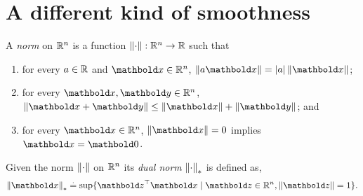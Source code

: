\documentclass{tufte-handout}
\begin{document}
\section{A different kind of smoothness}
\begin{defn}
A \emph{norm} on $\mathbb{R}^n$ is a function $\left\| \cdot \right\| : \mathbb{R}^n \to \mathbb{R}$ such that \begin{enumerate}
    \item for every $a \in \mathbb{R}$ and $\vx \in \R^n$, $\norm{a \vx} = \abs{a} \norm{\vx}$;
    \item for every $\vx, \vy \in \R^n$, $\norm{\vx+\vy} \leq \norm{\vx}+\norm{\vy}$; and
    \item for every $\vx \in \R^n$, $\norm{\vx} = 0$ implies $\vx = \vZero$.
\end{enumerate}
\end{defn}
\begin{defn}
Given the norm $\left\| \cdot \right\|$ on $\mathbb{R}^n$ its \emph{dual norm} $\left\| \cdot \right\|_*$ is defined as, \begin{align}
    \norm{\vx}_* \defeq \sup\{\trans{\vz}\vx \mid \vz \in \R^n, \norm{\vz}=1\}.
\end{align}
\end{defn}
\end{document}
